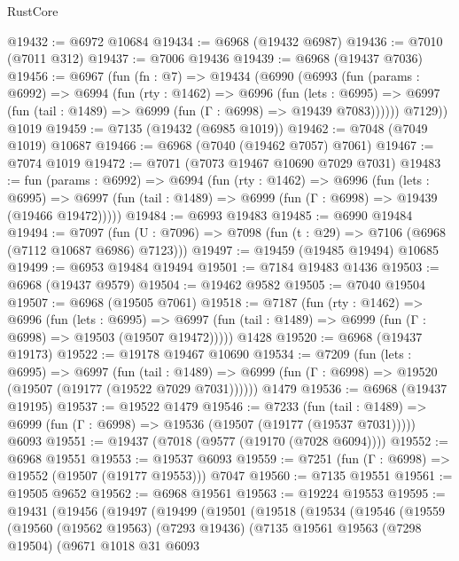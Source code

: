 \begin{lexlean}{RustCore}
\begin{coremodule}
@19432 := @6972 @10684
@19434 := @6968 (@19432 @6987)
@19436 := @7010 (@7011 @312)
@19437 := @7006 @19436
@19439 := @6968 (@19437 @7036)
@19456 := @6967
    (fun (fn : @7) =>
    @19434
      (@6990
        (@6993
          (fun (params : @6992) =>
          @6994
            (fun (rty : @1462) =>
            @6996
              (fun (lets : @6995) =>
              @6997 (fun (tail : @1489) => @6999 (fun (Γ : @6998) => @19439 @7083))))))
        @7129))
    @1019
@19459 := @7135 (@19432 (@6985 @1019))
@19462 := @7048 (@7049 @1019) @10687
@19466 := @6968 (@7040 (@19462 @7057) @7061)
@19467 := @7074 @1019
@19472 := @7071 (@7073 @19467 @10690 @7029 @7031)
@19483 := fun (params : @6992) =>
  @6994
    (fun (rty : @1462) =>
    @6996
      (fun (lets : @6995) =>
      @6997 (fun (tail : @1489) => @6999 (fun (Γ : @6998) => @19439 (@19466 @19472)))))
@19484 := @6993 @19483
@19485 := @6990 @19484
@19494 := @7097
    (fun (U : @7096) => @7098 (fun (t : @29) => @7106 (@6968 (@7112 @10687 @6986) @7123)))
@19497 := @19459 (@19485 @19494) @10685
@19499 := @6953 @19484 @19494
@19501 := @7184 @19483 @1436
@19503 := @6968 (@19437 @9579)
@19504 := @19462 @9582
@19505 := @7040 @19504
@19507 := @6968 (@19505 @7061)
@19518 := @7187
    (fun (rty : @1462) =>
    @6996
      (fun (lets : @6995) =>
      @6997 (fun (tail : @1489) => @6999 (fun (Γ : @6998) => @19503 (@19507 @19472)))))
    @1428
@19520 := @6968 (@19437 @19173)
@19522 := @19178 @19467 @10690
@19534 := @7209
    (fun (lets : @6995) =>
    @6997
      (fun (tail : @1489) =>
      @6999 (fun (Γ : @6998) => @19520 (@19507 (@19177 (@19522 @7029 @7031))))))
    @1479
@19536 := @6968 (@19437 @19195)
@19537 := @19522 @1479
@19546 := @7233
    (fun (tail : @1489) => @6999 (fun (Γ : @6998) => @19536 (@19507 (@19177 (@19537 @7031)))))
    @6093
@19551 := @19437 (@7018 (@9577 (@19170 (@7028 @6094))))
@19552 := @6968 @19551
@19553 := @19537 @6093
@19559 := @7251 (fun (Γ : @6998) => @19552 (@19507 (@19177 @19553))) @7047
@19560 := @7135 @19551
@19561 := @19505 @9652
@19562 := @6968 @19561
@19563 := @19224 @19553
@19595 := @19431
    (@19456
      (@19497
        (@19499
          (@19501
            (@19518
              (@19534
                (@19546
                  (@19559
                    (@19560
                      (@19562 @19563)
                      (@7293 @19436)
                      (@7135
                        @19561
                        @19563
                        (@7298 @19504)
                        (@9671
                          @1018
                          @31
                          @6093

\end{coremodule}
\end{lexlean}

